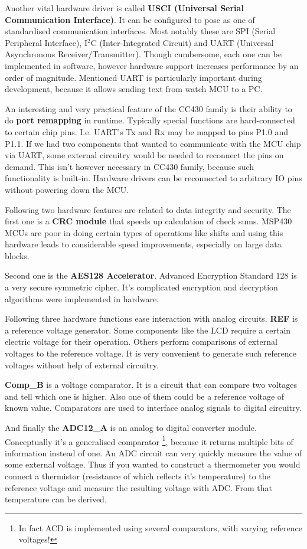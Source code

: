 Another vital hardware driver is called {\bf USCI (Universal Serial
Communication Interface)}. It can be configured to pose as one of
standardised communication interfaces. Most notably these are SPI
(Serial Peripheral Interface), I$^2$C (Inter-Integrated Circuit) and
UART (Universal Asynchronous Receiver/Transmitter). Though cumbersome,
each one can be implemented in software, however hardware support
increases performance by an order of magnitude. Mentioned UART is
particularly important during development, because it allows sending
text from watch MCU to a PC.

An interesting and very practical feature of the CC430 family is
their ability to do {\bf port remapping} in runtime. Typically special
functions are hard-connected to certain chip pins. I.e. UART's Tx and
Rx may be mapped to pins P1.0 and P1.1. If we had two components that
wanted to communicate with the MCU chip via UART, some external
circuitry would be needed to reconnect the pins on demand. This isn't
however necessary in CC430 family, because such functionality is
built-in. Hardware drivers can be reconnected to arbitrary IO pins
without powering down the MCU.

Following two hardware features are related to data integrity and
security. The first one is a {\bf CRC module} that speeds up
calculation of check sums.  MSP430 MCUs are poor in doing certain
types of operations like shifts and using this hardware leads to
considerable speed improvements, especially on large data blocks.

Second one is the {\bf AES128 Accelerator}. Advanced Encryption
Standard 128 is a very secure symmetric cipher. It's complicated
encryption and decryption algorithms were implemented in hardware.

Following three hardware functions ease interaction with analog
circuits.  {\bf REF} is a reference voltage generator. Some components
like the LCD require a certain electric voltage for their operation.
Others perform comparisons of external voltages to the reference
voltage. It is very convenient to generate such reference voltages
without help of external circuitry.

{\bf Comp\_B} is a voltage comparator. It is a circuit that can
compare two voltages and tell which one is higher. Also one of them
could be a reference voltage of known value. Comparators are used to
interface analog signals to digital circuitry.

And finally the {\bf ADC12\_A} is an analog to digital converter
module. Conceptually it's a generalised comparator \footnote{In
fact ACD is implemented using several comparators, with varying
reference voltages!}, because it returns multiple bits of information
instead of one.  An ADC circuit can very quickly measure the value of
some external voltage. Thus if you wanted to construct a thermometer
you would connect a thermistor (resistance of which reflects it's
temperature) to the reference voltage and measure the resulting
voltage with ADC. From that temperature can be derived.

